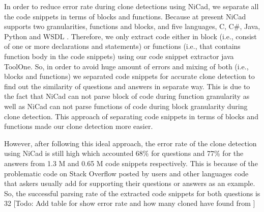 \documentclass[conference]{IEEEtran}
\begin{document}
	In order to reduce error rate during clone detections using NiCad, we separate all the code snippets in terms of blocks and functions. Because at present NiCad supports two granularities, functions and blocks, and five languages, C, C\#, Java, Python and WSDL \cite{b7}. Therefore, we only extract code either in block (i.e., consist of one or more declarations and statements) or functions (i.e., that contains function body in the code snippets) using our code snippet extractor java ToolOne. So, in order to avoid huge amount of errors and mixing of both (i.e., blocks and functions) we separated code snippets for accurate clone detection to find out the similarity of questions and answers in separate way. This is due to the fact that NiCad can not parse block of code during function granularity as well as NiCad can not parse functions of code during block granularity during clone detection. This approach of separating code snippets in terms of blocks and functions made our clone detection more easier. 
	
	However, after following this ideal approach, the error rate of the clone detection using NiCad is still high which accounted 68\% for questions and 77\% for the answers from 1.3 M and 0.65 M code snippets respectively. This is because of the problematic code on Stack Overflow posted by users and other languages code that askers usually add for supporting their questions or answers as an example. So, the successful parsing rate of the extracted code snippets for both questions is 32%
	[Todo: Add table for show error rate and how many cloned have found from ]
	
\end{document}
